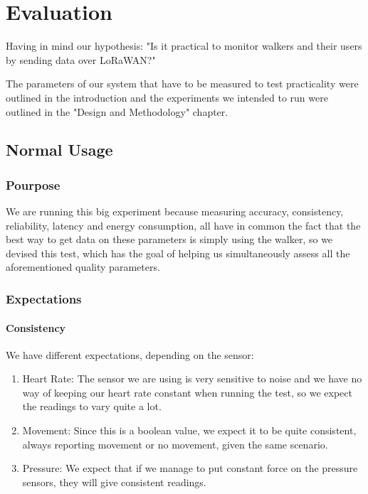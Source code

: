 \chapter{Evaluation}
\label{cha:evaluation}

Having in mind our hypothesis: "Is it practical to monitor walkers and their users by sending data over LoRaWAN?"

The parameters of our system that have to be measured to test practicality were outlined in the introduction and the experiments we intended to run were outlined in the "Design and Methodology" chapter.


\section{Normal Usage}

	\subsection{Pourpose}
		We are running this big experiment because measuring accuracy, consistency, reliability, latency and energy consumption, all have in common the fact that the best way to get data on these parameters is simply using the walker, so we devised this test, which has the goal of helping us simultaneously assess all the aforementioned quality parameters.

	\subsection{Expectations}
		\subsubsection*{Consistency}
			We have different expectations, depending on the sensor:

			\begin{enumerate}
				\item Heart Rate: The sensor we are using is very sensitive to noise and we have no way of keeping our heart rate constant when running the test, so we expect the readings to vary quite a lot.
				\item Movement: Since this is a boolean value, we expect it to be quite consistent, always reporting movement or no movement, given the same scenario.
				\item Pressure: We expect that if we manage to put constant force on the pressure sensors, they will give consistent readings.
			\end{enumerate}

